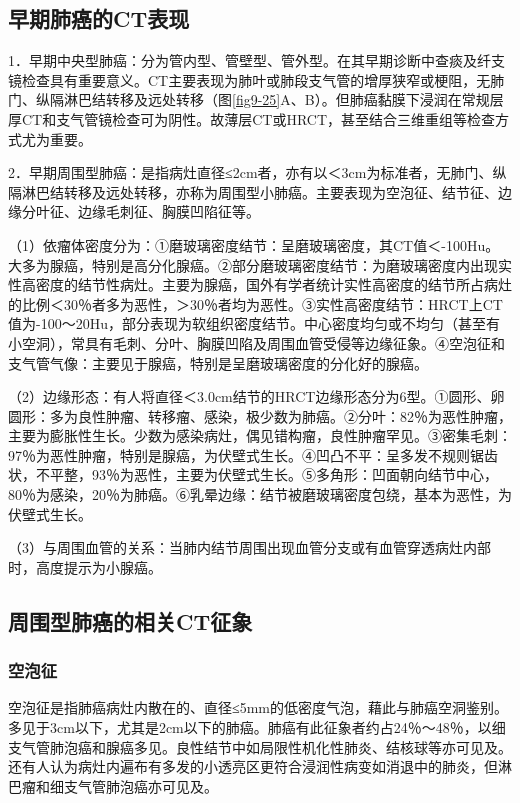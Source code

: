 \subsection{早期肺癌的CT表现}

1．早期中央型肺癌：分为管内型、管壁型、管外型。在其早期诊断中查痰及纤支镜检查具有重要意义。CT主要表现为肺叶或肺段支气管的增厚狭窄或梗阻，无肺门、纵隔淋巴结转移及远处转移（图\ref{fig9-25}A、B）。但肺癌黏膜下浸润在常规层厚CT和支气管镜检查可为阴性。故薄层CT或HRCT，甚至结合三维重组等检查方式尤为重要。

2．早期周围型肺癌：是指病灶直径≤2cm者，亦有以＜3cm为标准者，无肺门、纵隔淋巴结转移及远处转移，亦称为周围型小肺癌。主要表现为空泡征、结节征、边缘分叶征、边缘毛刺征、胸膜凹陷征等。

（1）依瘤体密度分为：①磨玻璃密度结节：呈磨玻璃密度，其CT值＜-100Hu。大多为腺癌，特别是高分化腺癌。②部分磨玻璃密度结节：为磨玻璃密度内出现实性高密度的结节性病灶。主要为腺癌，国外有学者统计实性高密度的结节所占病灶的比例＜30％者多为恶性，＞30％者均为恶性。③实性高密度结节：HRCT上CT值为-100～20Hu，部分表现为软组织密度结节。中心密度均匀或不均匀（甚至有小空洞），常具有毛刺、分叶、胸膜凹陷及周围血管受侵等边缘征象。④空泡征和支气管气像：主要见于腺癌，特别是呈磨玻璃密度的分化好的腺癌。

（2）边缘形态：有人将直径＜3.0cm结节的HRCT边缘形态分为6型。①圆形、卵圆形：多为良性肿瘤、转移瘤、感染，极少数为肺癌。②分叶：82％为恶性肿瘤，主要为膨胀性生长。少数为感染病灶，偶见错构瘤，良性肿瘤罕见。③密集毛刺：97％为恶性肿瘤，特别是腺癌，为伏壁式生长。④凹凸不平：呈多发不规则锯齿状，不平整，93％为恶性，主要为伏壁式生长。⑤多角形：凹面朝向结节中心，80％为感染，20％为肺癌。⑥乳晕边缘：结节被磨玻璃密度包绕，基本为恶性，为伏壁式生长。

（3）与周围血管的关系：当肺内结节周围出现血管分支或有血管穿透病灶内部时，高度提示为小腺癌。

\subsection{周围型肺癌的相关CT征象}

\subsubsection{空泡征}

空泡征是指肺癌病灶内散在的、直径≤5mm的低密度气泡，藉此与肺癌空洞鉴别。多见于3cm以下，尤其是2cm以下的肺癌。肺癌有此征象者约占24％～48％，以细支气管肺泡癌和腺癌多见。良性结节中如局限性机化性肺炎、结核球等亦可见及。还有人认为病灶内遍布有多发的小透亮区更符合浸润性病变如消退中的肺炎，但淋巴瘤和细支气管肺泡癌亦可见及。

